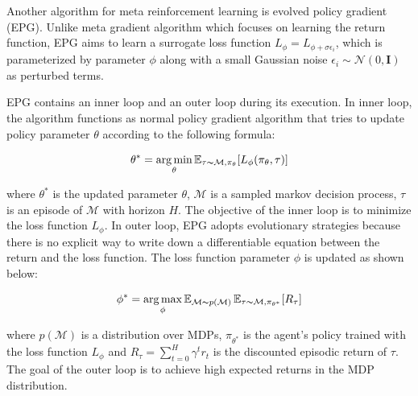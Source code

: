 Another algorithm for meta reinforcement learning is evolved policy gradient (EPG)\cite{epg}. Unlike meta gradient algorithm which focuses on learning the return function, EPG aims to learn a surrogate loss function $L_\phi = L_{\phi + \sigma\epsilon_i}$, which is parameterized by parameter $\phi$ along with a small Gaussian noise $\epsilon_i \sim \mathcal{N}(0, \mathbf{I})$ as perturbed terms.

\par
EPG contains an inner loop and an outer loop during its execution. In inner loop, the algorithm functions as normal policy gradient algorithm that tries to update policy parameter $\theta$ according to the following formula:

\[\theta^* = \operatorname*{arg\,min}_\theta\operatorname{\mathbb{E}}_{\tau\thicksim\mathcal{M},\pi_\theta}[L_\phi(\pi_\theta,\tau)]\]

where $\theta^*$ is the updated parameter $\theta$, $\mathcal{M}$ is a sampled markov decision process, $\tau$ is an episode of $\mathcal{M}$ with horizon $\textit{H}$. The objective of the inner loop is to minimize the loss function $L_\phi$. In outer loop, EPG adopts evolutionary strategies because there is no explicit way to write down a differentiable equation between the return and the loss function. The loss function parameter $\phi$ is updated as shown below:

\[\phi^* = \operatorname*{arg\,max}_\phi\operatorname{\mathbb{E}}_{\mathcal{M}\thicksim p(\mathcal{M})}\operatorname{\mathbb{E}}_{\tau\thicksim\mathcal{M},\pi_{\theta^*}}[R_\tau]\]

where $p(\mathcal{M})$ is a distribution over MDPs, $\pi_{\theta^*}$ is the agent's policy trained with the loss function $L_\phi$ and $R_\tau = \sum_{t=0}^{H}\gamma^t{r_t}$ is the discounted episodic return of $\tau$. The goal of the outer loop is to achieve high expected returns in the MDP distribution.

